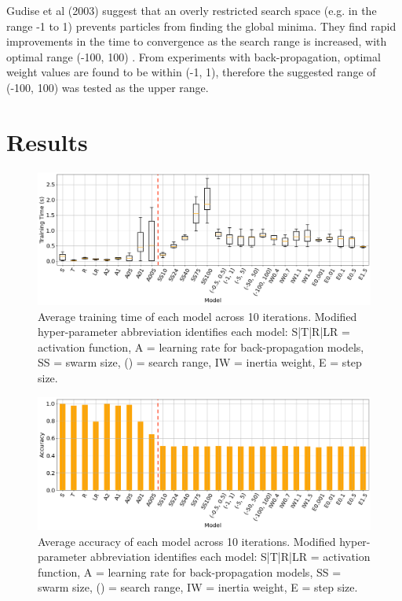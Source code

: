\documentclass[12pt]{article}
\begin{document}
Gudise et al (2003) suggest that an overly restricted search space (e.g. in the range -1 to 1) prevents particles from finding the global minima. They find rapid improvements in the time to convergence as the search range is increased, with optimal range (-100, 100) \cite{Gudise}. From experiments with back-propagation, optimal weight values are found to be within (-1, 1), therefore the suggested range of (-100, 100) was tested as the upper range.

\vspace{-1.5em}
\section{Results}
\vspace{-1.5em}


\begin{figure}[H]
  \centering
  \includegraphics[width=1\textwidth]{figs/combo_ttime.png}
  \caption{
    Average training time of each model across 10 iterations.
    Modified hyper-parameter abbreviation identifies each model:
    S|T|R|LR = activation function, A = learning rate for back-propagation models,
    SS = swarm size, () = search range, IW = inertia weight, E = step size.
  }
  \label{fig:ttime}
\end{figure}

\begin{figure}[H]
  \centering
  \includegraphics[width=1\textwidth]{figs/combo_acc.png}
  \caption{
    Average accuracy of each model across 10 iterations.
    Modified hyper-parameter abbreviation identifies each model:
    S|T|R|LR = activation function, A = learning rate for back-propagation models,
    SS = swarm size, () = search range, IW = inertia weight, E = step size.
  }
  \label{fig:accuracy}
\end{figure}
\end{document}
